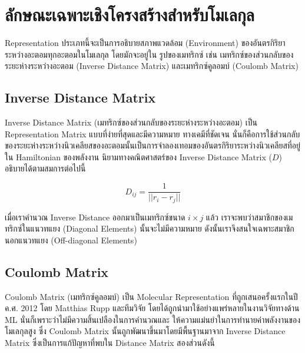 \section{ลักษณะเฉพาะเชิงโครงสร้างสำหรับโมเลกุล}
\label{sec:struc_feat_mol}

Representation ประเภทนี้จะเป็นการอธิบายสภาพแวดล้อม (Environment) ของอันตรกิริยาระหว่างอะตอมทุกอะตอมในโมเลกุล โดยมักจะอยู่ใน%
รูปของเมทริกซ์ เช่น เมทริกซ์ของส่วนกลับของระยะห่างระหว่างอะตอม (Inverse Distance Matrix) และเมทริกซ์คูลอมบ์ (Coulomb Matrix)

\subsection{Inverse Distance Matrix}
\label{ssec:inv_dist_mat}

Inverse Distance Matrix (เมทริกซ์ของส่วนกลับของระยะห่างระหว่างอะตอม) เป็น Representation Matrix แบบที่ง่ายที่สุดและมีความหมาย%
ทางเคมีที่ชัดเจน นั่นก็คือการใช้ส่วนกลับของระยะห่างระหว่างนิวเคลียสของอะตอมนั้นเป็นการจำลองเทอมของอันตรกิริยาระหว่างนิวเคลียสที่อยู่ใน 
Hamiltonian ของพลังงาน นิยามทางคณิตศาสตร์ของ Inverse Distance Matrix ($D$) อธิบายได้ตามสมการต่อไปนี้

\begin{equation}
    D_{ij} = \frac{1}{||r_{i} - r_{j}||}
\end{equation}

เมื่อเราคำนวณ Inverse Distance ออกมาเป็นเมทริกซ์ขนาด $i \times j$ แล้ว เราจะพบว่าสมาชิกของเมทริกซ์ในแนวทแยง (Diagonal 
Elements) นั้นจะไม่มีความหมาย ดังนั้นเราจึงสนใจเฉพาะสมาชิกนอกแนวทแยง (Off-diagonal Elements)

\subsection{Coulomb Matrix}
\label{ssec:coulomb_mat}

Coulomb Matrix (เมทริกซ์คูลอมบ์) เป็น Molecular Representation ที่ถูกเสนอครั้งแรกในปี ค.ศ. 2012 โดย Matthias Rupp 
และทีมวิจัย\autocite{rupp2012} โดยได้ถูกนำมาใช้อย่างแพร่หลายในงานวิจัยทางด้าน ML นั่นก็เพราะว่าไม่มีความสิ้นเปลืองในการคำนวณและ%
ให้ความแม่นยำในการทำนายค่าพลังงานของโมเลกุลสูง ซึ่ง Coulomb Matrix นั้นถูกพัฒนาขึ้นมาโดยมีพื้นฐานมาจาก Inverse Distance Matrix 
ซึ่งเป็นการแก้ปัญหาที่พบใน Distance Matrix สองส่วนดังนี้

